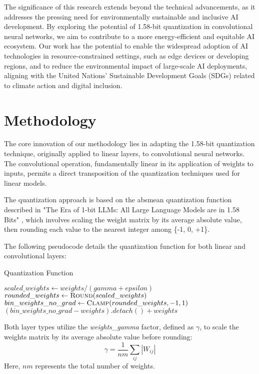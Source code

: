 \documentclass{article}
\begin{document}
The significance of this research extends beyond the technical advancements, as it addresses the pressing need for environmentally sustainable and inclusive AI development. By exploring the potential of 1.58-bit quantization in convolutional neural networks, we aim to contribute to a more energy-efficient and equitable AI ecosystem. Our work has the potential to enable the widespread adoption of AI technologies in resource-constrained settings, such as edge devices or developing regions, and to reduce the environmental impact of large-scale AI deployments, aligning with the United Nations' Sustainable Development Goals (SDGs) related to climate action and digital inclusion.

\section{Methodology}

The core innovation of our methodology lies in adapting the 1.58-bit quantization technique, originally applied to linear layers, to convolutional neural networks. The convolutional operation, fundamentally linear in its application of weights to inputs, permits a direct transposition of the quantization techniques used for linear models.

The quantization approach is based on the absmean quantization function described in "The Era of 1-bit LLMs: All Large Language Models are in 1.58 Bits" \cite{ma2024era}, which involves scaling the weight matrix by its average absolute value, then rounding each value to the nearest integer among \{-1, 0, +1\}.

The following pseudocode details the quantization function for both linear and convolutional layers:
\begin{algorithm}
  \caption{Quantization Function}
  \begin{algorithmic}[1]
      \State $scaled\_weights \gets weights / (gamma + epsilon)$
      \State $rounded\_weights \gets \Call{Round}{scaled\_weights}$
      \State $bin\_weights\_no\_grad \gets \Call{Clamp}{rounded\_weights, -1, 1}$
      \State \Return $(bin\_weights\_no\_grad - weights).detach() + weights$
  \EndFunction
  \end{algorithmic}
  \end{algorithm}


Both layer types utilize the \textit{weights\_gamma} factor, defined as $\gamma$, to scale the weights matrix by its average absolute value before rounding:
\[
\gamma = \frac{1}{nm} \sum_{ij} |W_{ij}| \tag{3}
\]
Here, $nm$ represents the total number of weights.
\end{document}
